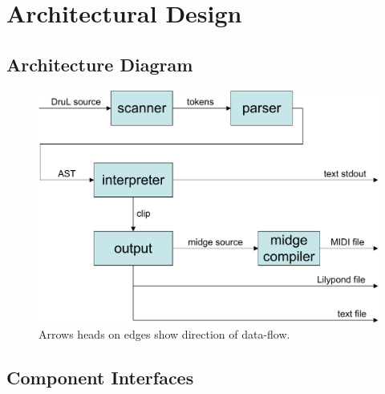 \chapter{Architectural Design}

\section{Architecture Diagram}

\begin{figure}[h]
\begin{center}
\includegraphics[width=.9\columnwidth]{Architecture_diagram.pdf}
\caption{Arrows heads on edges show direction of data-flow.}
\end{center}
\end{figure}

\section{Component Interfaces}


